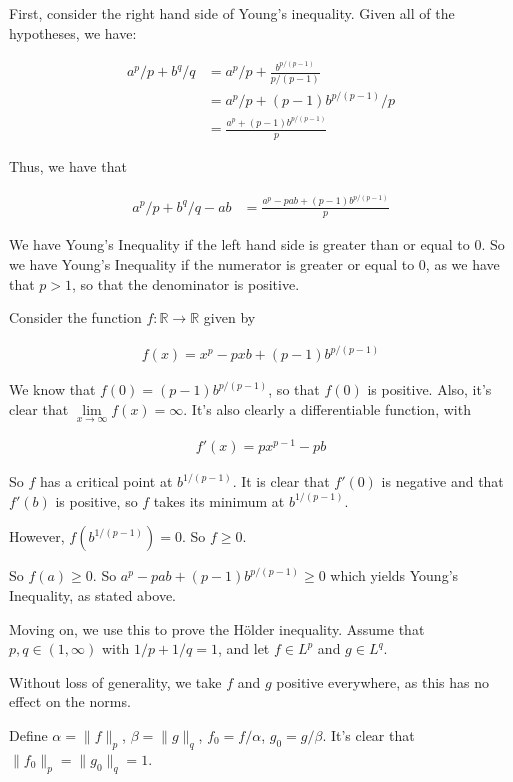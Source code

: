 \documentclass[a4paper,12pt]{article}
\newcommand{\norm}[1]{\|#1\|}
\newcommand{\al}{\alpha} %
\newcommand{\be}{\beta}
\newcommand{\R}{\mathbb{R}}
\begin{document}
First, consider the right hand side of Young's inequality. Given all of the hypotheses, we have:

\begin{align*}
a^p/p + b^q/q &= a^p/p +\frac{b^{p/(p-1)}}{p/(p-1)}\\
&=a^p/p + (p-1)b^{p/(p-1)}/p\\
&=\frac{a^p+(p-1)b^{p/(p-1)}}{p}
\end{align*}

Thus, we have that

\begin{align*}
a^p/p+b^q/q -ab &= \frac{a^p-pab+(p-1)b^{p/(p-1)}}{p}
\end{align*}

We have Young's Inequality if the left hand side is greater than or equal to $0$. So we have Young's Inequality if the numerator is greater or equal to $0$, as we have that $p>1$, so that the denominator is positive.

Consider the function $f: \R \to \R$ given by 

\begin{align*}
f(x) = x^p-pxb+(p-1)b^{p/(p-1)}
\end{align*}

We know that $f(0) = (p-1)b^{p/(p-1)}$, so that $f(0)$ is positive. Also, it's clear that $\lim\limits_{x \to \infty} f(x) = \infty$. It's also clearly a differentiable function, with

\begin{align*}
f'(x) = px^{p-1} - pb
\end{align*}

So $f$ has a critical point at $b^{1/(p-1)}$. It is clear that $f'(0)$ is negative and that $f'(b)$ is positive, so $f$ takes its minimum at $b^{1/(p-1)}$.

However, $f(b^{1/(p-1)})=0$. So $f \geq 0$.

So $f(a) \geq 0$. So $a^p-pab+(p-1)b^{p/(p-1)} \geq 0$ which yields Young's Inequality, as stated above.

Moving on, we use this to prove the H{\"o}lder inequality. Assume that $p,q \in (1, \infty)$ with $1/p + 1/q = 1$, and let $f \in L^p$ and $g \in L^q$. 

Without loss of generality, we take $f$ and $g$ positive everywhere, as this has no effect on the norms. 

Define $\al = \norm{f}_p$, $\be = \norm{g}_q$, $f_0 = f/\al$, $g_0 = g/\be$. It's clear that $\norm{f_0}_p = \norm{g_0}_q = 1$. 
\end{document}
